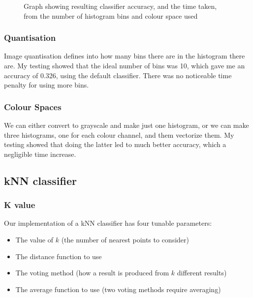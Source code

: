 \documentclass{article}
\begin{document}
\begin{multicols}{2}
\begin{figure}[H]
	\caption{Graph showing resulting classifier accuracy, and the time taken, from the number of histogram bins and colour space used} 
    \label{fig:colourhistograms}
\end{figure}


\subsubsection{Quantisation}
Image quantisation defines into how many bins there are in the histogram there are. My testing showed that the ideal number of bins was 10, which gave me an accuracy of 0.326, using the default classifier. There was no noticeable time penalty for using more bins.

\subsubsection{Colour Spaces}
We can either convert to grayscale and make just one histogram, or we can make three histograms, one for each colour channel, and them vectorize them. My testing showed that doing the latter led to much better accuracy, which a negligible time increase.

\subsection{kNN classifier}
\subsubsection{K value}
Our implementation of a kNN classifier has four tunable parameters:

\begin{itemize}
	\item The value of $k$ (the number of nearest points to consider)
	\item The distance function to use
	\item The voting method (how a result is produced from $k$ different results)
	\item The average function to use (two voting methods require averaging)
\end{itemize}


\end{multicols}
\end{document}
